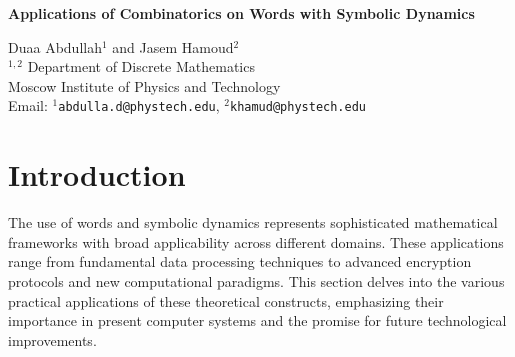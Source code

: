 \documentclass[12pt,a4paper]{article}
\begin{document}
\date{ }
\begin{center}
{\large \bf Applications of Combinatorics on Words with Symbolic Dynamics}
\end{center}
\begin{center}
Duaa Abdullah$^1$ and  Jasem Hamoud$^{2}$\\[6pt]
 $^{1,2}$ Department of Discrete Mathematics\\
Moscow Institute of Physics and Technology\\[6pt]

Email: $^{1}${\tt abdulla.d@phystech.edu},
 $^{2}${\tt khamud@phystech.edu}
\end{center}
\noindent
\begin{abstract}
In this paper, we explore applications of combinatorics on words across various domains, including data compression, error detection, cryptographic protocols, and pseudorandom number generation. The examination of the theoretical foundations enabling these applications, emphasizing important concepts of mathematical relationships and algorithms. In data compression, we discuss the Lempel-Ziv family of algorithms and Lyndon factorization, with the number of Lyndon words of length \( n \) over an alphabet of size \( k \) given by 
\[
L(n,k) = \frac{1}{n} \sum_{d|n} \mu(d) k^{n/d}.
\]
We address cryptographic protocols and pseudorandom number generation, highlighting the role of pseudorandomness theory and complexity measures. Also, by explore de Bruijn sequences, topological entropy, and synchronizing words in their practical contexts, demonstrating their contributions to optimizing information storage, ensuring data integrity, and enhancing cybersecurity.

\noindent\textbf{MSC Classification 2020:}  68R15, 11B39, 05A05, 	68R15, 	37B10.

\noindent\textbf{Keywords:} Words, Combinatorics, Analysis, Symbolic Dynamics.
\end{abstract}
\section{Introduction} \label{sec8}

The use of words and symbolic dynamics represents sophisticated mathematical frameworks with broad applicability across different domains.  These applications range from fundamental data processing techniques to advanced encryption protocols and new computational paradigms.  This section delves into the various practical applications of these theoretical constructs, emphasizing their importance in present computer systems and the promise for future technological improvements.
\end{document}
